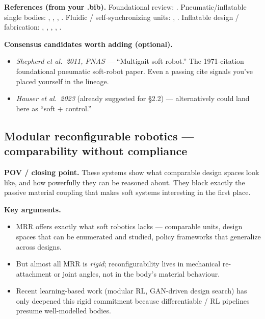\textbf{References (from your .bib).}
Foundational review: \cite{rusDesignFabricationControl2015}.
Pneumatic/inflatable single bodies:
\cite{waitSelfLocomotionSpherical2010},
\cite{usevitchUntetheredIsoperimetricSoft2020},
\cite{kimSimpleTripodMobile2019},
\cite{boothSurfaceActuationSensing2021}.
Fluidic / self-synchronizing units:
\cite{mousaMultifunctionalFluidicUnits},
\cite{eguchiFluidicSwarmEmbodimentSwarm2025}.
Inflatable design / fabrication:
\cite{yang_snapinflatables_2024},
\cite{wangPneuFabDesigningLowCost2023a},
\cite{ouTEI2016Studio2016},
\cite{schaffner3DPrintingRobotic2018},
\cite{pattersonMethod3DPrinting2023}.

\textbf{Consensus candidates worth adding (optional).}
\begin{itemize}
    \item \emph{Shepherd et al.\ 2011, PNAS} --- ``Multigait soft robot.''
          The 1971-citation foundational pneumatic soft-robot paper.
          Even a passing cite signals you've placed yourself in the
          lineage.
    \item \emph{Hauser et al.\ 2023} (already suggested for \S2.2) ---
          alternatively could land here as ``soft + control.''
\end{itemize}

\subsection{Modular reconfigurable robotics --- comparability without compliance}
\label{subsec:mrr}

\textbf{POV / closing point.} These systems show what comparable
design spaces look like, and how powerfully they can be reasoned
about. They block exactly the passive material coupling that makes
soft systems interesting in the first place.

\textbf{Key arguments.}
\begin{itemize}
    \item MRR offers exactly what soft robotics lacks --- comparable
          units, design spaces that can be enumerated and studied,
          policy frameworks that generalize across designs.
    \item But almost all MRR is \emph{rigid}; reconfigurability lives
          in mechanical re-attachment or joint angles, not in the
          body's material behaviour.
    \item Recent learning-based work (modular RL, GAN-driven design
          search) has only deepened this rigid commitment because
          differentiable / RL pipelines presume well-modelled bodies.
\end{itemize}

